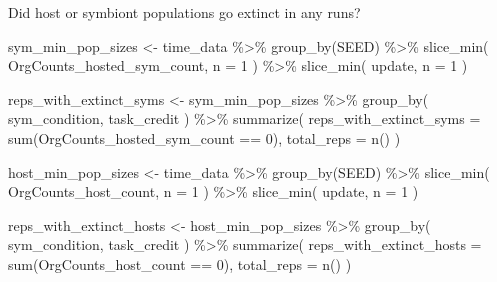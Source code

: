 \documentclass[
]{book}
\newenvironment{Shaded}{\begin{snugshade}}{\end{snugshade}}
\newcommand{\AttributeTok}[1]{\textcolor[rgb]{0.77,0.63,0.00}{#1}}
\newcommand{\DecValTok}[1]{\textcolor[rgb]{0.00,0.00,0.81}{#1}}
\newcommand{\FunctionTok}[1]{\textcolor[rgb]{0.00,0.00,0.00}{#1}}
\newcommand{\NormalTok}[1]{#1}
\newcommand{\OtherTok}[1]{\textcolor[rgb]{0.56,0.35,0.01}{#1}}
\newcommand{\SpecialCharTok}[1]{\textcolor[rgb]{0.00,0.00,0.00}{#1}}
\begin{document}
Did host or symbiont populations go extinct in any runs?

\begin{Shaded}
\begin{Highlighting}[]
\NormalTok{sym\_min\_pop\_sizes }\OtherTok{\textless{}{-}}\NormalTok{ time\_data }\SpecialCharTok{\%\textgreater{}\%}
  \FunctionTok{group\_by}\NormalTok{(SEED) }\SpecialCharTok{\%\textgreater{}\%}
  \FunctionTok{slice\_min}\NormalTok{(}
\NormalTok{    OrgCounts\_hosted\_sym\_count,}
    \AttributeTok{n =} \DecValTok{1}
\NormalTok{  ) }\SpecialCharTok{\%\textgreater{}\%}
  \FunctionTok{slice\_min}\NormalTok{(}
\NormalTok{    update,}
    \AttributeTok{n =} \DecValTok{1}
\NormalTok{  )}

\NormalTok{reps\_with\_extinct\_syms }\OtherTok{\textless{}{-}}\NormalTok{ sym\_min\_pop\_sizes }\SpecialCharTok{\%\textgreater{}\%}
  \FunctionTok{group\_by}\NormalTok{(}
\NormalTok{    sym\_condition,}
\NormalTok{    task\_credit}
\NormalTok{  ) }\SpecialCharTok{\%\textgreater{}\%}
  \FunctionTok{summarize}\NormalTok{(}
    \AttributeTok{reps\_with\_extinct\_syms =} \FunctionTok{sum}\NormalTok{(OrgCounts\_hosted\_sym\_count }\SpecialCharTok{==} \DecValTok{0}\NormalTok{),}
    \AttributeTok{total\_reps =} \FunctionTok{n}\NormalTok{()}
\NormalTok{  )}

\NormalTok{host\_min\_pop\_sizes }\OtherTok{\textless{}{-}}\NormalTok{ time\_data }\SpecialCharTok{\%\textgreater{}\%}
  \FunctionTok{group\_by}\NormalTok{(SEED) }\SpecialCharTok{\%\textgreater{}\%}
  \FunctionTok{slice\_min}\NormalTok{(}
\NormalTok{    OrgCounts\_host\_count,}
    \AttributeTok{n =} \DecValTok{1}
\NormalTok{  ) }\SpecialCharTok{\%\textgreater{}\%}
  \FunctionTok{slice\_min}\NormalTok{(}
\NormalTok{    update,}
    \AttributeTok{n =} \DecValTok{1}
\NormalTok{  )}

\NormalTok{reps\_with\_extinct\_hosts }\OtherTok{\textless{}{-}}\NormalTok{ host\_min\_pop\_sizes }\SpecialCharTok{\%\textgreater{}\%}
  \FunctionTok{group\_by}\NormalTok{(}
\NormalTok{    sym\_condition,}
\NormalTok{    task\_credit}
\NormalTok{  ) }\SpecialCharTok{\%\textgreater{}\%}
  \FunctionTok{summarize}\NormalTok{(}
    \AttributeTok{reps\_with\_extinct\_hosts =} \FunctionTok{sum}\NormalTok{(OrgCounts\_host\_count }\SpecialCharTok{==} \DecValTok{0}\NormalTok{),}
    \AttributeTok{total\_reps =} \FunctionTok{n}\NormalTok{()}
\NormalTok{  )}


\end{Highlighting}
\end{Shaded}
\end{document}
